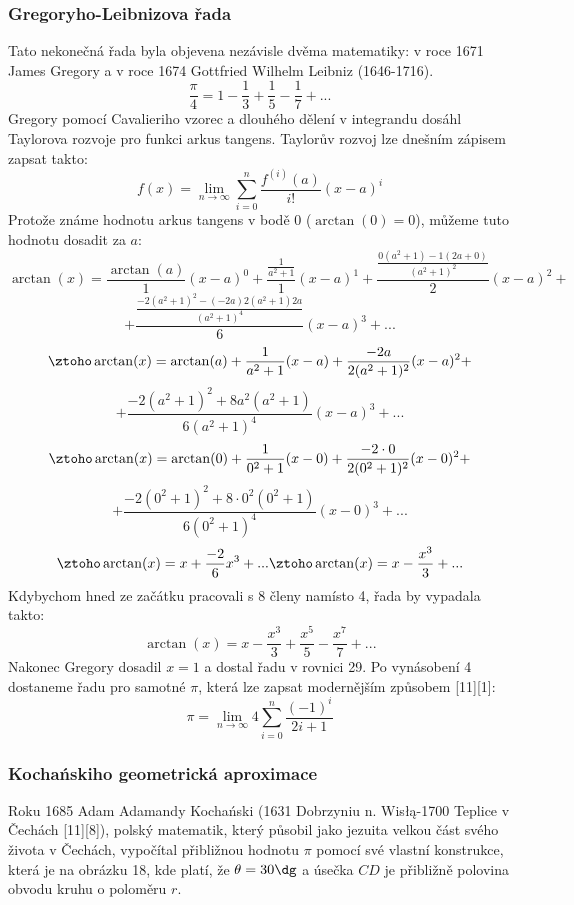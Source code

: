 \documentclass[rocnikovka]{gzwroc} %
\begin{document}
\subsubsection{Gregoryho-Leibnizova řada}
Tato nekonečná řada byla objevena nezávisle dvěma matematiky: v roce 1671 James Gregory a v roce 1674 Gottfried Wilhelm Leibniz (1646-1716).
\begin{equation}
\frac{\pi}{4}=1-\frac{1}{3}+\frac{1}{5}-\frac{1}{7}+...
\end{equation}
Gregory pomocí Cavalieriho vzorec a dlouhého dělení v integrandu dosáhl Taylorova rozvoje pro funkci arkus tangens. Taylorův rozvoj lze dnešním zápisem zapsat takto:
$$
f(x)=\lim_{n\to\infty} \sum_{i=0}^{n} \frac{f^{(i)}(a)}{i!}(x-a)^i
$$
Protože známe hodnotu arkus tangens v bodě 0 ($\arctan(0)=0$), můžeme tuto hodnotu dosadit za $a$:
$$
\arctan(x)=\frac{\arctan(a)}{1}(x-a)^0+\frac{\frac{1}{a^2+1}}{1}(x-a)^1+\frac{\frac{0(a^2+1)-1(2a+0)}{(a^2+1)^2}}{2}(x-a)^2+
$$
$$
+\frac{\frac{-2(a^2+1)^2-(-2a)2(a^2+1)2a}{(a^2+1)^4}}{6}(x-a)^3+...
$$
$$
\ztoho \arctan(x)=\arctan(a)+\frac{1}{a^2+1}(x-a)+\frac{-2a}{2(a^2+1)^2}(x-a)^2+
$$
$$
+\frac{-2(a^2+1)^2+8a^2(a^2+1)}{6(a^2+1)^4}(x-a)^3+...
$$
$$
\ztoho \arctan(x)=\arctan(0)+\frac{1}{0^2+1}(x-0)+\frac{-2\cdot0}{2(0^2+1)^2}(x-0)^2+
$$
$$
+\frac{-2(0^2+1)^2+8\cdot0^2(0^2+1)}{6(0^2+1)^4}(x-0)^3+...
$$
$$
\ztoho \arctan(x)=x+\frac{-2}{6}x^3+...\ztoho \arctan(x)=x-\frac{x^3}{3}+...
$$
Kdybychom hned ze začátku pracovali s 8 členy namísto 4, řada by vypadala takto:
$$
\arctan(x)=x-\frac{x^3}{3}+\frac{x^5}{5}-\frac{x^7}{7}+...
$$
Nakonec Gregory dosadil $x=1$ a dostal řadu v rovnici 29. Po vynásobení 4 dostaneme řadu pro samotné $\pi$, která lze zapsat modernějším způsobem [11][1]:
\begin{equation}
\pi=\lim_{n\to\infty} 4\sum_{i=0}^{n} \frac{(-1)^i}{2i+1}
\end{equation}
\subsubsection{Kochańskiho geometrická aproximace}
Roku 1685 Adam Adamandy Kochański (1631 Dobrzyniu n. Wisłą-1700 Teplice v Čechách [11][8]), polský matematik, který působil jako jezuita velkou část svého života v Čechách, vypočítal přibližnou hodnotu $\pi$ pomocí své vlastní konstrukce, která je na obrázku 18, kde platí, že $\theta =30\dg$ a úsečka $CD$ je přibližně polovina obvodu kruhu o poloměru $r$.
\end{document}
